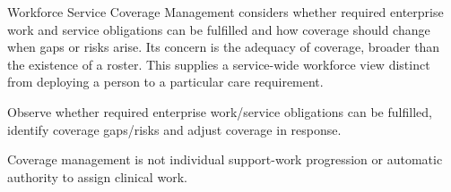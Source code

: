 Workforce Service Coverage Management considers whether required enterprise work and service obligations can be fulfilled and how coverage should change when gaps or risks arise. Its concern is the adequacy of coverage, broader than the existence of a roster. This supplies a service-wide workforce view distinct from deploying a person to a particular care requirement.



Observe whether required enterprise work/\allowbreak{}service obligations can be fulfilled, identify coverage gaps/\allowbreak{}risks and adjust coverage in response.



Coverage management is not individual support-work progression or automatic authority to assign clinical work.


